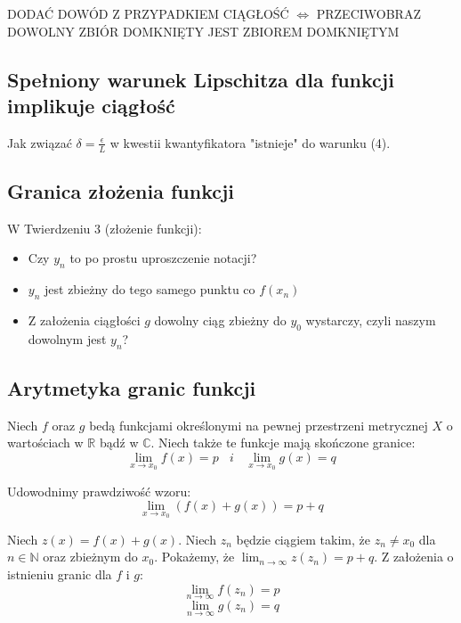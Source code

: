 \documentclass{article}
\begin{document}
\begin{center}
    DODAĆ DOWÓD Z PRZYPADKIEM CIĄGŁOŚĆ \(\iff\) PRZECIWOBRAZ DOWOLNY ZBIÓR DOMKNIĘTY JEST ZBIOREM DOMKNIĘTYM
\end{center}

\subsection{Spełniony warunek Lipschitza dla funkcji implikuje ciągłość}

Jak związać \(\delta = \frac{\epsilon}{L}\) w kwestii kwantyfikatora "istnieje" do warunku (4).

\subsection{Granica złożenia funkcji}

W Twierdzeniu 3 (złożenie funkcji):

\begin{itemize}
    \item Czy \(y_n\) to po prostu uproszczenie notacji?
    \item \(y_n\) jest zbieżny do tego samego punktu co \(f(x_n)\)
    \item Z założenia ciągłości \(g\) dowolny ciąg zbieżny do \(y_0\) wystarczy, czyli naszym dowolnym jest \(y_n\)?
\end{itemize}

\subsection{Arytmetyka granic funkcji}

\newpage
Niech \(f\) oraz \(g\) bedą funkcjami określonymi na pewnej przestrzeni metrycznej \(X\) o wartościach
w \(\mathbb{R}\) bądź w \(\mathbb{C}\). Niech także te funkcje mają skończone granice:
\begin{equation*}
    \lim_{x \to x_0} f(x) = p \ \ \ \ i \ \ \ \ \lim_{x \to x_0} g(x) = q
\end{equation*}

Udowodnimy prawdziwość wzoru:
\begin{equation*}
    \lim_{x \to x_0}(f(x) + g(x)) = p + q
\end{equation*}

Niech \(z(x) = f(x) + g(x)\). Niech \(z_n\) będzie ciągiem takim, że \(z_n \neq x_0\) dla \(n \in \mathbb{N}\) oraz zbieżnym do \(x_0\).
Pokażemy, że \(\lim_{n \to \infty} z(z_n) = p + q\). Z założenia o istnieniu granic dla \(f\) i \(g\):
\begin{equation*}
    \lim_{n \to \infty} f(z_n) = p
\end{equation*}
\begin{equation*}
    \lim_{n \to \infty} g(z_n) = q
\end{equation*}
\end{document}
